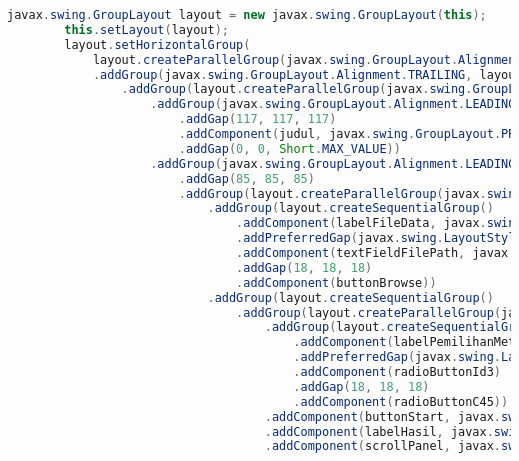\begin{lstlisting}[language=Java,basicstyle=\tiny,caption=View.java]
        javax.swing.GroupLayout layout = new javax.swing.GroupLayout(this);
        this.setLayout(layout);
        layout.setHorizontalGroup(
            layout.createParallelGroup(javax.swing.GroupLayout.Alignment.LEADING)
            .addGroup(javax.swing.GroupLayout.Alignment.TRAILING, layout.createSequentialGroup()
                .addGroup(layout.createParallelGroup(javax.swing.GroupLayout.Alignment.TRAILING)
                    .addGroup(javax.swing.GroupLayout.Alignment.LEADING, layout.createSequentialGroup()
                        .addGap(117, 117, 117)
                        .addComponent(judul, javax.swing.GroupLayout.PREFERRED_SIZE, 399, javax.swing.GroupLayout.PREFERRED_SIZE)
                        .addGap(0, 0, Short.MAX_VALUE))
                    .addGroup(javax.swing.GroupLayout.Alignment.LEADING, layout.createSequentialGroup()
                        .addGap(85, 85, 85)
                        .addGroup(layout.createParallelGroup(javax.swing.GroupLayout.Alignment.LEADING)
                            .addGroup(layout.createSequentialGroup()
                                .addComponent(labelFileData, javax.swing.GroupLayout.DEFAULT_SIZE, 138, Short.MAX_VALUE)
                                .addPreferredGap(javax.swing.LayoutStyle.ComponentPlacement.UNRELATED)
                                .addComponent(textFieldFilePath, javax.swing.GroupLayout.PREFERRED_SIZE, 209, javax.swing.GroupLayout.PREFERRED_SIZE)
                                .addGap(18, 18, 18)
                                .addComponent(buttonBrowse))
                            .addGroup(layout.createSequentialGroup()
                                .addGroup(layout.createParallelGroup(javax.swing.GroupLayout.Alignment.LEADING, false)
                                    .addGroup(layout.createSequentialGroup()
                                        .addComponent(labelPemilihanMethod, javax.swing.GroupLayout.PREFERRED_SIZE, 147, javax.swing.GroupLayout.PREFERRED_SIZE)
                                        .addPreferredGap(javax.swing.LayoutStyle.ComponentPlacement.RELATED)
                                        .addComponent(radioButtonId3)
                                        .addGap(18, 18, 18)
                                        .addComponent(radioButtonC45))
                                    .addComponent(buttonStart, javax.swing.GroupLayout.PREFERRED_SIZE, 124, javax.swing.GroupLayout.PREFERRED_SIZE)
                                    .addComponent(labelHasil, javax.swing.GroupLayout.PREFERRED_SIZE, 89, javax.swing.GroupLayout.PREFERRED_SIZE)
                                    .addComponent(scrollPanel, javax.swing.GroupLayout.DEFAULT_SIZE, 441, Short.MAX_VALUE)

\end{lstlisting}
